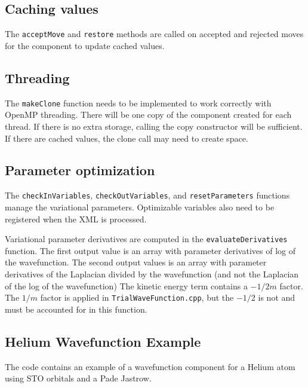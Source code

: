 \subsection{Caching values}
The \texttt{acceptMove} and \texttt{restore} methods are called on accepted and rejected moves for
the component to update cached values.


\subsection{Threading}
The \texttt{makeClone} function needs to be implemented to work correctly with OpenMP threading.
There will be one copy of the component created for each thread.
If there is no extra storage, calling the copy constructor will be sufficient.
If there are cached values, the clone call may need to create space.


\subsection{Parameter optimization}

The \texttt{checkInVariables}, \texttt{checkOutVariables}, and \texttt{resetParameters} functions manage the variational parameters.
Optimizable variables also need to be registered when the XML is processed.

Variational parameter derivatives are computed in the \texttt{evaluateDerivatives} function.
The first output value is an array with parameter derivatives of log of the wavefunction.
The second output values is an array with parameter derivatives of
the Laplacian divided by the wavefunction (and not the Laplacian of the log of the wavefunction)
The kinetic energy term contains a $-1/2m$ factor.
The $1/m$ factor is applied in \texttt{TrialWaveFunction.cpp}, but the $-1/2$ is not and must be accounted for in this function.




\subsection{Helium Wavefunction Example}
\label{sec:helium_wavefunction_example}
The code contains an example of a wavefunction component for a Helium atom using STO orbitals and a Pade Jastrow.

